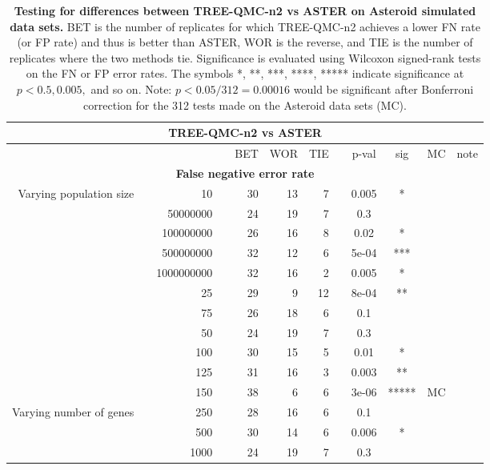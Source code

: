 \begin{table}[!h]
\caption[Statistical testing for TREE-QMC-n2 vs ASTER on Asteroid data]{
\textbf{Testing for differences between TREE-QMC-n2 vs ASTER on Asteroid simulated data sets.}
BET is the number of replicates for which TREE-QMC-n2 achieves a lower FN rate (or FP rate) and thus is better than ASTER, WOR is the reverse, and TIE is the number of replicates where the two methods tie.
Significance is evaluated using Wilcoxon signed-rank tests on the FN or FP error rates.
The symbols *, **, ***, ****, ***** indicate significance at $p < 0.5, 0.005,$ and so on.
Note: $p < 0.05 / 312 = 0.00016$ would be significant after Bonferroni correction for the 312 tests made on the Asteroid data sets (MC).}
\centering
\scriptsize
\begin{tabular}{r r r l r r r l c c c l}
\toprule 
\multicolumn{12}{c}{\textbf{TREE-QMC-n2 vs ASTER}} \\
\midrule
\multirow{ 1}{2cm}{}
& & & & BET & WOR & TIE & & p-val & sig & MC & note \\
\midrule
\multicolumn{12}{c}{\textbf{False negative error rate}} \\
\midrule
\multirow{ 6}{2cm}{Varying population size}
 & & 10 & & 30 & 13 & 7 & & 0.005 & * &  &  \\
   & & 50000000 & & 24 & 19 & 7 & & 0.3 &  &  &  \\
   & & 100000000 & & 26 & 16 & 8 & & 0.02 & * &  &  \\
   & & 500000000 & & 32 & 12 & 6 & & 5e-04 & *** &  &  \\
   & & 1000000000 & & 32 & 16 & 2 & & 0.005 & * &  &  \\
\midrule
\multirow{ 6}{2cm}{Varying number of taxa}
   & & 25 & & 29 & 9 & 12 & & 8e-04 & ** &  &  \\
   & & 75 & & 26 & 18 & 6 & & 0.1 &  &  &  \\
   & & 50 & & 24 & 19 & 7 & & 0.3 &  &  &  \\
   & & 100 & & 30 & 15 & 5 & & 0.01 & * &  &  \\
   & & 125 & & 31 & 16 & 3 & & 0.003 & ** &  &  \\
   & & 150 & & 38 & 6 & 6 & & 3e-06 & ***** & MC &  \\
\midrule
\multirow{ 4}{2cm}{Varying number of genes}
   & & 250 & & 28 & 16 & 6 & & 0.1 &  &  &  \\
   & & 500 & & 30 & 14 & 6 & & 0.006 & * &  &  \\
   & & 1000 & & 24 & 19 & 7 & & 0.3 &  &  &  \\

\end{tabular}
\end{table}
